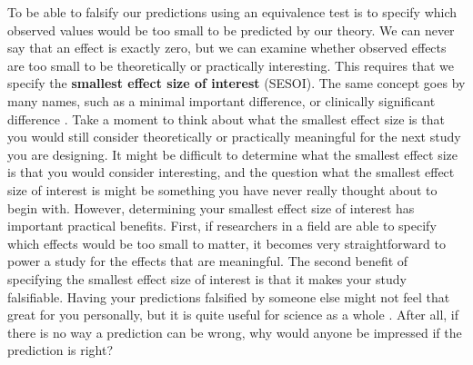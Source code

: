 \documentclass[
  oneside]{book}
\begin{document}
To be able to falsify our predictions using an equivalence test is to specify which observed values would be too small to be predicted by our theory. We can never say that an effect is exactly zero, but we can examine whether observed effects are too small to be theoretically or practically interesting. This requires that we specify the \textbf{smallest effect size of interest} (SESOI). The same concept goes by many names, such as a minimal important difference, or clinically significant difference \citep{king_point_2011}. Take a moment to think about what the smallest effect size is that you would still consider theoretically or practically meaningful for the next study you are designing. It might be difficult to determine what the smallest effect size is that you would consider interesting, and the question what the smallest effect size of interest is might be something you have never really thought about to begin with. However, determining your smallest effect size of interest has important practical benefits. First, if researchers in a field are able to specify which effects would be too small to matter, it becomes very straightforward to power a study for the effects that are meaningful. The second benefit of specifying the smallest effect size of interest is that it makes your study falsifiable. Having your predictions falsified by someone else might not feel that great for you personally, but it is quite useful for science as a whole \citep{popper_logic_2002}. After all, if there is no way a prediction can be wrong, why would anyone be impressed if the prediction is right?
\end{document}
